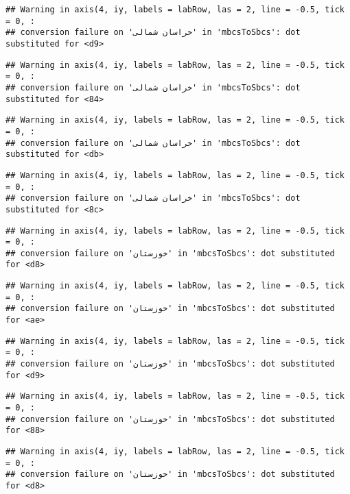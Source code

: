 \documentclass[
]{article}
\begin{document}
\begin{verbatim}
## Warning in axis(4, iy, labels = labRow, las = 2, line = -0.5, tick = 0, :
## conversion failure on 'خراسان شمالی' in 'mbcsToSbcs': dot substituted for <d9>
\end{verbatim}

\begin{verbatim}
## Warning in axis(4, iy, labels = labRow, las = 2, line = -0.5, tick = 0, :
## conversion failure on 'خراسان شمالی' in 'mbcsToSbcs': dot substituted for <84>
\end{verbatim}

\begin{verbatim}
## Warning in axis(4, iy, labels = labRow, las = 2, line = -0.5, tick = 0, :
## conversion failure on 'خراسان شمالی' in 'mbcsToSbcs': dot substituted for <db>
\end{verbatim}

\begin{verbatim}
## Warning in axis(4, iy, labels = labRow, las = 2, line = -0.5, tick = 0, :
## conversion failure on 'خراسان شمالی' in 'mbcsToSbcs': dot substituted for <8c>
\end{verbatim}

\begin{verbatim}
## Warning in axis(4, iy, labels = labRow, las = 2, line = -0.5, tick = 0, :
## conversion failure on 'خوزستان' in 'mbcsToSbcs': dot substituted for <d8>
\end{verbatim}

\begin{verbatim}
## Warning in axis(4, iy, labels = labRow, las = 2, line = -0.5, tick = 0, :
## conversion failure on 'خوزستان' in 'mbcsToSbcs': dot substituted for <ae>
\end{verbatim}

\begin{verbatim}
## Warning in axis(4, iy, labels = labRow, las = 2, line = -0.5, tick = 0, :
## conversion failure on 'خوزستان' in 'mbcsToSbcs': dot substituted for <d9>
\end{verbatim}

\begin{verbatim}
## Warning in axis(4, iy, labels = labRow, las = 2, line = -0.5, tick = 0, :
## conversion failure on 'خوزستان' in 'mbcsToSbcs': dot substituted for <88>
\end{verbatim}

\begin{verbatim}
## Warning in axis(4, iy, labels = labRow, las = 2, line = -0.5, tick = 0, :
## conversion failure on 'خوزستان' in 'mbcsToSbcs': dot substituted for <d8>
\end{verbatim}
\end{document}
